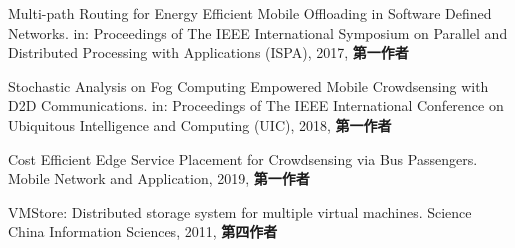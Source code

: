 \documentclass[format=draft,language=chinese,degree=phd,table,usenames,dvipsnames]{hustthesis}
\begin{document}
\begin{publications}

\item Multi-path Routing for Energy Efficient Mobile Offloading in Software Defined Networks. in: Proceedings of The IEEE International Symposium on Parallel and Distributed Processing with Applications (ISPA), 2017, \textbf{第一作者}
\item Stochastic Analysis on Fog Computing Empowered Mobile Crowdsensing with D2D Communications. in: Proceedings of The IEEE International Conference on Ubiquitous Intelligence and Computing (UIC), 2018, \textbf{第一作者}
\item Cost Efficient Edge Service Placement for Crowdsensing via Bus Passengers. Mobile Network and Application, 2019, \textbf{第一作者}
\item VMStore: Distributed storage system for multiple virtual machines. Science China Information Sciences, 2011, \textbf{第四作者}
\end{publications}
\end{document}
